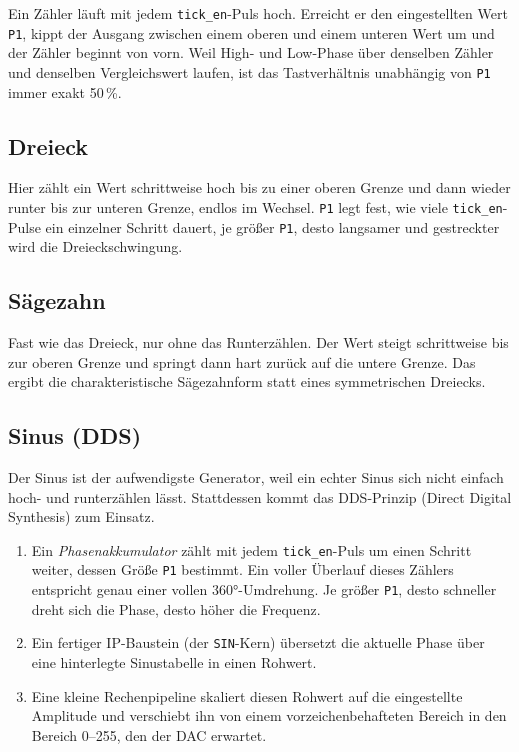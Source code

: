 Ein Zähler läuft mit jedem \texttt{tick\_en}-Puls hoch. Erreicht er den eingestellten Wert \texttt{P1}, kippt der Ausgang zwischen einem oberen und einem unteren Wert um und der Zähler beginnt von vorn. Weil High- und Low-Phase über denselben Zähler und denselben Vergleichswert laufen, ist das Tastverhältnis unabhängig von \texttt{P1} immer exakt 50\,\%.

\subsection{Dreieck}

Hier zählt ein Wert schrittweise hoch bis zu einer oberen Grenze und dann wieder runter bis zur unteren Grenze, endlos im Wechsel. \texttt{P1} legt fest, wie viele \texttt{tick\_en}-Pulse ein einzelner Schritt dauert, je größer \texttt{P1}, desto langsamer und \glqq gestreckter\grqq{} wird die Dreieckschwingung.

\subsection{Sägezahn}

Fast wie das Dreieck, nur ohne das Runterzählen. Der Wert steigt schrittweise bis zur oberen Grenze und springt dann hart zurück auf die untere Grenze. Das ergibt die charakteristische Sägezahnform statt eines symmetrischen Dreiecks.

\subsection{Sinus (DDS)}

Der Sinus ist der aufwendigste Generator, weil ein echter Sinus sich nicht einfach hoch- und runterzählen lässt. Stattdessen kommt das DDS-Prinzip (Direct Digital Synthesis) zum Einsatz.

\begin{enumerate}
    \item Ein \emph{Phasenakkumulator} zählt mit jedem \texttt{tick\_en}-Puls um einen Schritt weiter, dessen Größe \texttt{P1} bestimmt. Ein voller Überlauf dieses Zählers entspricht genau einer vollen 360°-Umdrehung. Je größer \texttt{P1}, desto schneller dreht sich die Phase, desto höher die Frequenz.
    \item Ein fertiger IP-Baustein (der \texttt{SIN}-Kern) übersetzt die aktuelle Phase über eine hinterlegte Sinustabelle in einen Rohwert.
    \item Eine kleine Rechenpipeline skaliert diesen Rohwert auf die eingestellte Amplitude und verschiebt ihn von einem vorzeichenbehafteten Bereich in den Bereich 0--255, den der DAC erwartet.
\end{enumerate}

